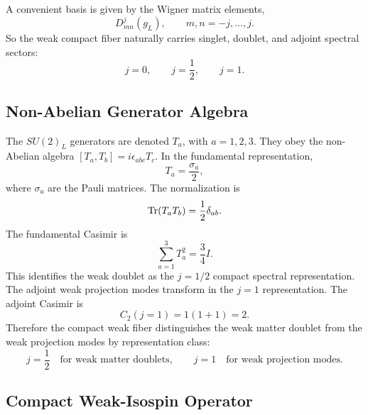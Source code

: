 \documentclass[11pt]{article}
\begin{document}
A convenient basis is given by the Wigner matrix elements,
\begin{equation}
D^j_{mn}(g_L),
\qquad
m,n=-j,\ldots,j.
\end{equation}
So the weak compact fiber naturally carries singlet, doublet, and adjoint spectral sectors:
\begin{equation}
j=0,
\qquad
j=\frac12,
\qquad
j=1.
\end{equation}

\subsection{Non-Abelian Generator Algebra}
\label{sec:pr2_nonabelian_generator_algebra}

The \(SU(2)_L\) generators are denoted \(T_a\), with $a=1,2,3$. They obey the non-Abelian algebra $[T_a,T_b]=i\epsilon_{abc}T_c$. In the fundamental representation,
\begin{equation}
T_a
=
\frac{\sigma_a}{2},
\end{equation}
where \(\sigma_a\) are the Pauli matrices. 
The normalization is
\begin{equation}
{\rm Tr}(T_aT_b)
=
\frac12\delta_{ab}.
\end{equation}
The fundamental Casimir is
\begin{equation}
\boxed{
\sum_{a=1}^3T_a^2
=
\frac34I.
}
\end{equation}
This identifies the weak doublet as the \(j=1/2\) compact spectral representation. The adjoint weak projection modes transform in the \(j=1\) representation. 
The adjoint Casimir is
\begin{equation}
C_2(j=1)
=
1(1+1)
=
2.
\end{equation}
Therefore the compact weak fiber distinguishes the weak matter doublet from the weak projection modes by representation class:
\begin{equation}
\boxed{
j=\frac12
\quad
\text{for weak matter doublets},
\qquad
j=1
\quad
\text{for weak projection modes}.
}
\end{equation}

\subsection{Compact Weak-Isospin Operator}
\label{sec:pr2_compact_weak_isospin_operator}
\end{document}
